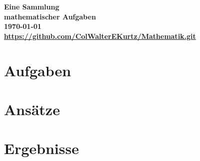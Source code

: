 \documentclass
[
  draft    = true,
  fontsize = 11pt,
  parskip  = half-,
  BCOR     = 0pt,
  DIV      = 11,
  ngerman,
  dvipsnames
]
{scrbook}
\begin{document}


\begin{titlepage}
  \centering
  \sffamily
  \begingroup
    \bfseries
    \Huge
    \vspace*{2\baselineskip}
    Eine Sammlung\\
    \vspace*{\baselineskip}
    mathematischer Aufgaben\\
    \vspace*{2\baselineskip}
    \normalsize
    \today\\
  \endgroup
  \vspace*{\fill}
  \url{https://github.com/ColWalterEKurtz/Mathematik.git}
\end{titlepage}

\tableofcontents

\clearpage
{}

\newcommand{\subdir}{}


\chapter{Aufgaben}

\chapter{Ansätze}

\chapter{Ergebnisse}

\end{document}
